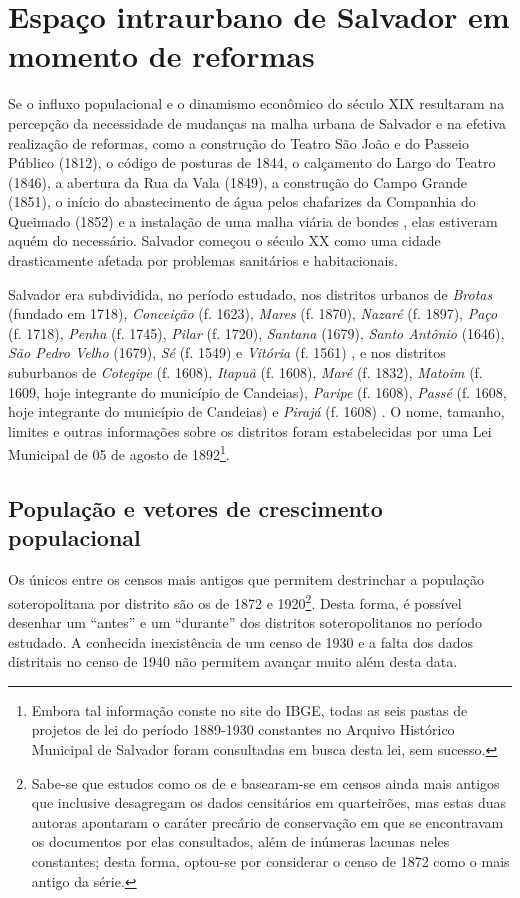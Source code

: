 \section{Espaço intraurbano de Salvador em momento de reformas}\label{sec:1.4}

Se o influxo populacional e o dinamismo econômico do século XIX resultaram na percepção da necessidade de mudanças na malha urbana de Salvador e na efetiva realização de reformas, como a construção do Teatro São João e do Passeio Público (1812), o código de posturas de 1844, o calçamento do Largo do Teatro (1846), a abertura da Rua da Vala (1849), a construção do Campo Grande (1851), o início do abastecimento de água pelos chafarizes da Companhia do Queimado (1852) e a instalação de uma malha viária de bondes \cite{fernandesgomes1992, fernandessampaiogomes1999, NASCIMENTO2007, SAMPAIO2005}, elas estiveram aquém do necessário. Salvador começou o século XX como uma cidade drasticamente afetada por problemas sanitários e habitacionais.

Salvador era subdividida, no período estudado, nos distritos urbanos de \textit{Brotas} (fundado em 1718), \textit{Conceição} (f. 1623), \textit{Mares} (f. 1870), \textit{Nazaré} (f. 1897), \textit{Paço} (f. 1718), \textit{Penha} (f. 1745), \textit{Pilar} (f. 1720), \textit{Santana} (1679), \textit{Santo Antônio }(1646), \textit{São Pedro Velho} (1679), \textit{Sé} (f. 1549) e \textit{Vitória} (f. 1561) \cite[259-307]{VASCONCELOS2002}, e nos distritos suburbanos de \textit{Cotegipe} (f. 1608), \textit{Itapuã} (f. 1608), \textit{Maré} (f. 1832), \textit{Matoim} (f. 1609, hoje integrante do município de Candeias), \textit{Paripe} (f. 1608), \textit{Passé} (f. 1608, hoje integrante do município de Candeias) e \textit{Pirajá} (f. 1608) \cite[p.~53-62]{NASCIMENTO2007}. O nome, tamanho, limites e outras informações sobre os distritos foram estabelecidas por uma Lei Municipal de 05 de agosto de 1892\footnote{Embora tal informação conste no site do IBGE, todas as seis pastas de projetos de lei do período 1889-1930 constantes no Arquivo Histórico Municipal de Salvador foram consultadas em busca desta lei, sem sucesso.}.

\subsection{População e vetores de crescimento populacional}\label{subsubsec:populacaosalvador}

Os únicos entre os censos mais antigos que permitem destrinchar a população soteropolitana por distrito são os de 1872 e 1920\footnote{Sabe-se que estudos como os de  e  basearam-se em censos ainda mais antigos que inclusive desagregam os dados censitários em quarteirões, mas estas duas autoras apontaram o caráter precário de conservação em que se encontravam os documentos por elas consultados, além de inúmeras lacunas neles constantes; desta forma, optou-se por considerar o censo de 1872 como o mais antigo da série.}. Desta forma, é possível desenhar um ``antes'' e um ``durante'' dos distritos soteropolitanos no período estudado. A conhecida inexistência de um censo de 1930 e a falta dos dados distritais no censo de 1940 não permitem avançar muito além desta data. 

